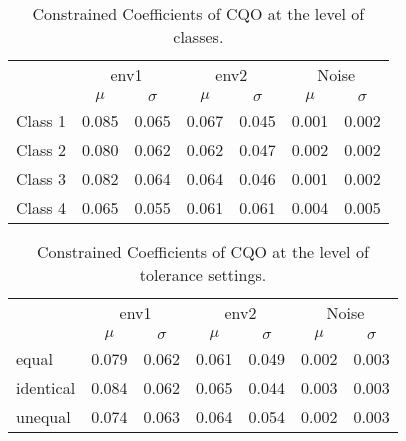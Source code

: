			\begin{table*}[h!] 
				
				\normalsize
				\caption{Constrained Coefficients of CQO at the level of classes.}
				\centering
				
				\begin{tabular}{@{}lcccccc@{}}
					\toprule
					& \multicolumn{2}{c}{env1} & \multicolumn{2}{c}{env2} & \multicolumn{2}{c}{Noise}\\\cmidrule(l){2-3} \cmidrule(l){4-5} \cmidrule(l){6-7}
					& $\mu$ & $\sigma$ & $\mu$ & $\sigma$ & $\mu$ & $\sigma$\\
					\hline
					Class 1 & 0.085 & 0.065 & 0.067 & 0.045 & 0.001 & 0.002 \\
					Class 2 & 0.080 & 0.062 & 0.062 & 0.047 & 0.002 & 0.002 \\
					Class 3 & 0.082 & 0.064 & 0.064 & 0.046 & 0.001 & 0.002 \\
					Class 4 & 0.065 & 0.055 & 0.061 & 0.061 & 0.004 & 0.005 \\
					\toprule
				\end{tabular}
			
				\label{tab:cqosm2}
			
			\end{table*}
		
			\begin{table*}[h!] 
				
				\normalsize
				\caption{Constrained Coefficients of CQO at the level of tolerance settings.}
				\centering
				
				\begin{tabular}{@{}lcccccc@{}}
					
					\toprule
					& \multicolumn{2}{c}{env1} & \multicolumn{2}{c}{env2} & \multicolumn{2}{c}{Noise}\\\cmidrule(l){2-3} \cmidrule(l){4-5} \cmidrule(l){6-7}
					& $\mu$ & $\sigma$ & $\mu$ & $\sigma$ & $\mu$ & $\sigma$\\
					\hline
					equal & 0.079 & 0.062 & 0.061 & 0.049 & 0.002 & 0.003 \\
					identical & 0.084 & 0.062 & 0.065 & 0.044 & 0.003 & 0.003 \\
					unequal & 0.074 & 0.063 & 0.064 & 0.054 & 0.002 & 0.003 \\
					\toprule
				\end{tabular}
			
				\label{tab:cqosm3}
			
			\end{table*}
		

